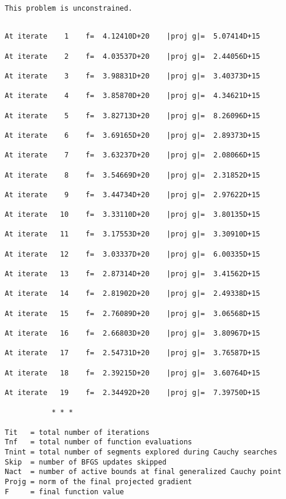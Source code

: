 \documentclass[11pt]{article}
\begin{document}
    \begin{Verbatim}[commandchars=\\\{\}]
 This problem is unconstrained.
    \end{Verbatim}

    \begin{Verbatim}[commandchars=\\\{\}]

At iterate    1    f=  4.12410D+20    |proj g|=  5.07414D+15

At iterate    2    f=  4.03537D+20    |proj g|=  2.44056D+15

At iterate    3    f=  3.98831D+20    |proj g|=  3.40373D+15

At iterate    4    f=  3.85870D+20    |proj g|=  4.34621D+15

At iterate    5    f=  3.82713D+20    |proj g|=  8.26096D+15

At iterate    6    f=  3.69165D+20    |proj g|=  2.89373D+15

At iterate    7    f=  3.63237D+20    |proj g|=  2.08066D+15

At iterate    8    f=  3.54669D+20    |proj g|=  2.31852D+15

At iterate    9    f=  3.44734D+20    |proj g|=  2.97622D+15

At iterate   10    f=  3.33110D+20    |proj g|=  3.80135D+15

At iterate   11    f=  3.17553D+20    |proj g|=  3.30910D+15

At iterate   12    f=  3.03337D+20    |proj g|=  6.00335D+15

At iterate   13    f=  2.87314D+20    |proj g|=  3.41562D+15

At iterate   14    f=  2.81902D+20    |proj g|=  2.49338D+15

At iterate   15    f=  2.76089D+20    |proj g|=  3.06568D+15

At iterate   16    f=  2.66803D+20    |proj g|=  3.80967D+15

At iterate   17    f=  2.54731D+20    |proj g|=  3.76587D+15

At iterate   18    f=  2.39215D+20    |proj g|=  3.60764D+15

At iterate   19    f=  2.34492D+20    |proj g|=  7.39750D+15

           * * *

Tit   = total number of iterations
Tnf   = total number of function evaluations
Tnint = total number of segments explored during Cauchy searches
Skip  = number of BFGS updates skipped
Nact  = number of active bounds at final generalized Cauchy point
Projg = norm of the final projected gradient
F     = final function value


\end{Verbatim}
\end{document}
